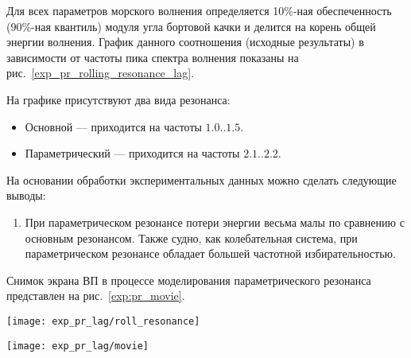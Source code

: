 Для всех параметров морского волнения определяется 10\%-ная обеспеченность (90\%-ная квантиль) модуля угла бортовой качки и делится на корень общей энергии волнения. График данного соотношения (исходные результаты) в зависимости от частоты пика спектра волнения показаны на рис.~\ref{exp_pr_rolling_resonance_lag}.

На графике присутствуют два вида резонанса:
\begin{itemize}
	\item	Основной --- приходится на частоты $1.0..1.5$.
	\item	Параметрический --- приходится на частоты $2.1..2.2$.
\end{itemize}


На основании обработки экспериментальных данных можно сделать следующие выводы:
\begin{enumerate}
	\item	При параметрическом резонансе потери энергии весьма малы по сравнению с основным резонансом. 
			Также судно, как колебательная система, при параметрическом резонансе обладает большей частотной избирательностью.
\end{enumerate}

Снимок экрана ВП в процессе моделирования параметрического резонанса представлен на рис.~\ref{exp:pr_movie}.

\begin{sidewaysfigure}
	\begin{center}
	\texttt{[image: exp\_pr\_lag/roll\_resonance]}
	\end{center}
	\caption{Основной и параметрический резонанс бортовой качки}
	\label{exp_pr_rolling_resonance_lag}
\end{sidewaysfigure}


\begin{sidewaysfigure}
	\begin{center}
	\texttt{[image: exp\_pr\_lag/movie]}
	\end{center}
	\caption{Опасный крен вызванный параметрическим резонансом}
	\label{exp:pr_movie}
\end{sidewaysfigure}

